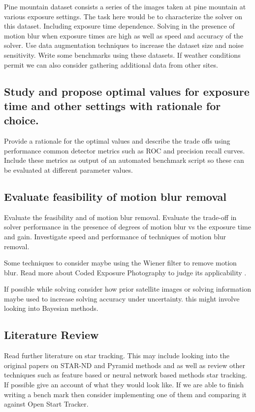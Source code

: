 \documentclass[]{article}
\begin{document}
	Pine mountain dataset consists a series of the images taken at pine mountain at various exposure settings. The task here would be to 
	characterize the solver on this dataset. Including exposure time dependence. Solving in the presence of motion blur when exposure times are high as well as speed and accuracy of the solver. Use data augmentation techniques to increase the  dataset size and noise sensitivity. Write some benchmarks using these datasets. If weather conditions permit we can also consider gathering additional data from other sites.
	
	\subsection{Study and propose optimal values for exposure time and other settings with rationale for choice.}
	
	Provide a rationale for the optimal values and describe the trade offs using performance common detector metrics such as ROC and precision 
	recall curves.  Include these metrics as output of an automated benchmark script so these can be evaluated at different parameter values.
	
	\subsection{Evaluate feasibility of motion blur removal} 
	
	Evaluate the feasibility and of motion blur removal. Evaluate the trade-off in solver performance in the presence of degrees of motion blur vs the exposure time and gain.  Investigate speed and performance of techniques of motion blur
	removal.
	
	Some techniques to consider maybe using the Wiener filter to remove motion blur\cite{OpenCVMotionDeblurWeiner}. Read more about Coded Exposure Photography to judge its applicability \cite{CodedExposureMotionBlur}.
	
	If possible while solving consider how prior satellite images or solving information maybe used to increase solving accuracy under uncertainty.  this might involve looking into Bayesian methods.
	
	\subsection{Literature Review}
	
	Read further literature on star tracking. This may include looking into the original papers on STAR-ND and Pyramid methods and as well as review other techniques such as feature based or neural network based methods star tracking. If possible give an account of what they would look like. If we are able to finish writing a bench mark then consider implementing one of them  and comparing it against Open Start Tracker. 
	
\end{document}
